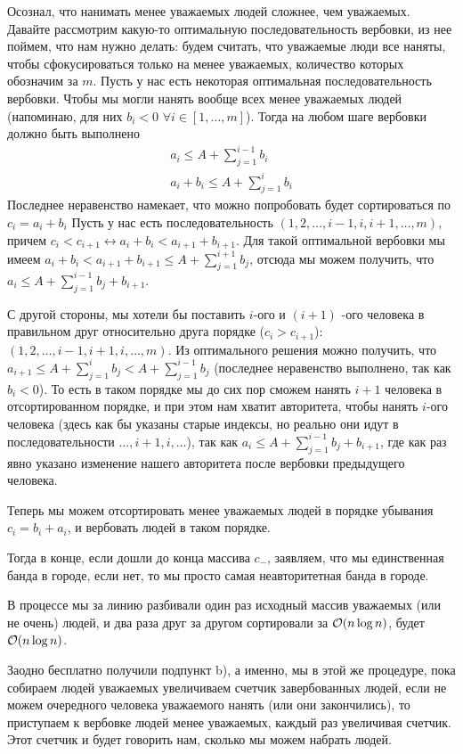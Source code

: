 \begin{solution}
    \begin{upd}
        Осознал, что нанимать менее уважаемых людей сложнее, чем уважаемых.
        Давайте рассмотрим какую-то оптимальную последовательность вербовки, из нее поймем, что нам нужно делать: будем считать, что уважаемые люди все наняты, чтобы сфокусироваться только на менее уважаемых, количество которых обозначим за $m$.
        Пусть у нас есть некоторая оптимальная последовательность вербовки.
        Чтобы мы могли нанять вообще всех менее уважаемых людей (напоминаю, для них $b_i < 0\,\,\forall i\in[1,\ldots,m]$).
        Тогда на любом шаге вербовки должно быть выполнено
        \begin{gather}
            a_i \leq A + \sum_{j=1}^{i-1}b_i \\
            a_i + b_i \leq A + \sum_{j=1}^{i}b_i
        \end{gather}
        Последнее неравенство намекает, что можно попробовать будет сортироваться по $c_i = a_i + b_i$
        Пусть у нас есть последовательность $(1,2,\ldots,i-1,i,i+1,\ldots,m)$, причем $c_i < c_{i+1} \leftrightarrow a_i + b_i < a_{i+1} + b_{i+1}$.
        Для такой оптимальной вербовки мы имеем $a_i + b_i < a_{i+1}+b_{i+1} \leq A + \sum_{j=1}^{i+1}b_j$, отсюда мы можем получить, что $a_i \leq A + \sum_{j=1}^{i-1}b_j + b_{i+1}$.
        
        С другой стороны, мы хотели бы поставить $i$-ого и $(i+1)$ -ого человека в правильном друг относительно друга порядке ($c_i > c_{i+1}$): $(1,2,\ldots,i-1,i+1,i,\ldots,m)$.
        Из оптимального решения можно получить, что $a_{i+1} \leq A + \sum_{j=1}^{i}b_j < A + \sum_{j=1}^{i-1}b_j$ (последнее неравенство выполнено, так как $b_i < 0$).
        То есть в таком порядке мы до сих пор сможем нанять $i+1$ человека в отсортированном порядке, и при этом нам хватит авторитета, чтобы нанять $i$-ого человека (здесь как бы указаны старые индексы, но реально они идут в последовательности $\ldots,i+1,i,\ldots$), так как $a_i \leq A + \sum_{j=1}^{i-1}b_j + b_{i+1}$, где как раз явно указано изменение нашего авторитета после вербовки предыдущего человека.
    \end{upd}
    Теперь мы можем отсортировать менее уважаемых людей в порядке убывания $c_i = b_i + a_i$, и вербовать людей в таком порядке.
    
    Тогда в конце, если дошли до конца массива $c_-$, заявляем, что мы единственная банда в городе, если нет, то мы просто самая неавторитетная банда в городе.

    В процессе мы за линию разбивали один раз исходный массив уважаемых (или не очень) людей, и два раза друг за другом сортировали за $\mathcal{O}(n\log n)$, будет $\mathcal{O}(n\log n)$.
    
    \begin{remark}    
        Заодно бесплатно получили подпункт b), а именно, мы в этой же процедуре, пока собираем людей уважаемых увеличиваем счетчик завербованных людей, если не можем очередного человека уважаемого нанять (или они закончились), то приступаем к вербовке людей менее уважаемых, каждый раз увеличивая счетчик.
        Этот счетчик и будет говорить нам, сколько мы можем набрать людей.
    \end{remark}
\end{solution}